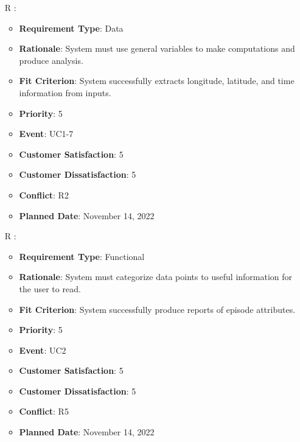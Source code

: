 \documentclass[12pt, titlepage]{article}
\newcounter{reqnum} %
\begin{document}
\begin{itemize}
\item[R\refstepcounter{reqnum}\thereqnum
\label{R_Inputs_2}:] 
\begin{itemize}
    \item \textbf{Requirement Type}: Data
    \item \textbf{Rationale}: System must use general variables to make computations and produce analysis.
    \item \textbf{Fit Criterion}: System successfully extracts longitude, latitude, and time information from inputs.
    \item \textbf{Priority}: 5
    \item \textbf{Event}: UC1-7
    \item \textbf{Customer Satisfaction}: 5
    \item \textbf{Customer Dissatisfaction}: 5
    \item \textbf{Conflict}: R2
    \item \textbf{Planned Date}: November 14, 2022
\end{itemize}

\item[R\refstepcounter{reqnum}\thereqnum
\label{R_Outputs_1}:] 
\begin{itemize}
    \item \textbf{Requirement Type}: Functional
    \item \textbf{Rationale}: System must categorize data points to useful information for the user to read.
    \item \textbf{Fit Criterion}: System successfully produce reports of episode attributes. 
    \item \textbf{Priority}: 5
    \item \textbf{Event}: UC2
    \item \textbf{Customer Satisfaction}: 5
    \item \textbf{Customer Dissatisfaction}: 5
    \item \textbf{Conflict}: R5
    \item \textbf{Planned Date}: November 14, 2022
\end{itemize}


\end{itemize}
\end{document}
